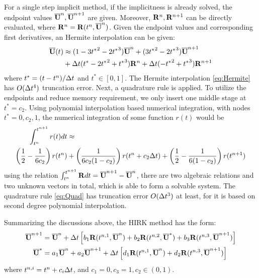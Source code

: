 \documentclass[preprint,12pt]{elsarticle}
\begin{document}
For a single step implicit method,
if the implicitness is already solved,
the endpoint values $\overline{\mathbf{U}}^n, \overline{\mathbf{U}}^{n+1}$ are
given. Moreover,  $\mathbf{R}^n, \mathbf{R}^{n+1}$ can be
directly evaluated, where $\mathbf{R}^n = \mathbf{R}(t^n, \overline{\mathbf{U}}^n)$.
Given the endpoint values and corresponding first derivatives,
an Hermite interpolation can be given:
\newcommand{\ttt}{t^*}
\begin{equation}
    \label{eq:Hermite}
    \begin{aligned}
        \uu(t) & \approx (1-3{\ttt}^2 - 2 {\ttt}^3)\uu^n
        + (3{\ttt}^2 - 2 {\ttt}^3)\uu^{n+1}                    \\
               & + \inc t ({\ttt} - 2 {\ttt}^2 + {\ttt}^3) \R^n
        + \inc t (- {\ttt}^2 + {\ttt}^3) \R^{n+1}
    \end{aligned}
\end{equation}
where $\ttt = (t - t^n)/\inc t$ and $\ttt \in [0,1]$.
The Hermite interpolation \eqref{eq:Hermite}
has $O(\mathrm\Delta t^4)$ truncation error.
Next, a quadrature rule is applied. 
To utilize the endpoints and reduce memory requirement, 
we only insert one middle stage at $\ttt = c_2$. 
Using polynomial interpolation based 
numerical integration, with nodes $\ttt = 0,c_2,1$, 
the numerical integration of some function $r(t)$ would be
\begin{equation}
    \label{eq:Quad}
    \begin{aligned}
        \int_{t^n}^{t^{n+1}}r(t)dt & \approx \\
         \left(\frac{1}{2} - \frac{1}{6{c_2}}\right)r(t^n)
         &+
        \left(\frac{1}{6{c_2}(1-{c_2})}\right)r(t^n + c_2\mathrm\Delta t )
        +
        \left(\frac{1}{2} - \frac{1}{6(1-{c_2})}\right)r(t^{n+1})
    \end{aligned}
\end{equation}
using the relation $\int_{t^n}^{t^{n+1}}\mathbf{R} dt = \overline{\mathbf{U}}^{n+1} -\overline{\mathbf{U}}^{n}$,
there are two algebraic relations and two unknown vectors 
in total, which is able to form a solvable system.  
The quadrature rule \eqref{eq:Quad} has truncation error 
$O(\mathrm\Delta t^3)$ at least,
for it is based on second degree polynomial interpolation.


Summarizing the discussions above, the HIRK method has the form:
\begin{subequations}
    \label{eq:HM3}
    \begin{align}
        \overline{\mathbf{U}}^{n+1} & = \overline{\mathbf{U}}^{n} +
        \mathrm\Delta t
        \left[
            b_1\mathbf{R}(t^{n,1}, \overline{\mathbf{U}}^n) +
            b_2\mathbf{R}(t^{n,2}, \overline{\mathbf{U}}^*) +
            b_3\mathbf{R}(t^{n,3}, \overline{\mathbf{U}}^{n+1})
        \right]   \label{eq:HM3-1} \\
        \overline{\mathbf{U}}^{*}   & =
        a_1\overline{\mathbf{U}}^{n} +
        a_2\overline{\mathbf{U}}^{n+1} +
        \mathrm\Delta t
        \left[
            d_1\mathbf{R}(t^{n,1}, \overline{\mathbf{U}}^n) +
            d_2\mathbf{R}(t^{n,3}, \overline{\mathbf{U}}^{n+1})
            \right] \label{eq:HM3-2}
    \end{align}
\end{subequations}
where $t^{n,i}=t^n+c_i\mathrm\Delta t$, and $c_1 = 0, c_3 = 1, c_2\in(0,1)$.
\end{document}
